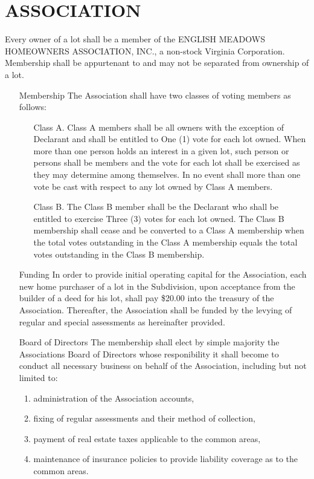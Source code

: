 \documentclass[12pt, letterpaper]{article}
\begin{document}
\section{ASSOCIATION}
Every owner of a lot shall be a member of the ENGLISH MEADOWS HOMEOWNERS ASSOCIATION, INC., a non-stock Virginia Corporation.
Membership shall be appurtenant to and may not be separated from ownership of a lot.
\begin{enumerate}
 \item[Membership] The Association shall have two classes of voting members as follows:
 \begin{itemize}
  \item[Class A.] Class A members shall be all owners with the exception of Declarant and shall be entitled to One (1) vote for each lot owned.
   When more than one person holds an interest in a given lot, such person or persons shall be members and the vote for each lot shall be exercised as they may determine among themselves.
   In no event shall more than one vote be cast with respect to any lot owned by Class A members.
  \item[Class B.] The Class B member shall be the Declarant who shall be entitled to exercise Three (3) votes for each lot owned.
   The Class B membership shall cease and be converted to a Class A membership when the total votes outstanding in the Class A membership equals the total votes outstanding in the Class B membership.
 \end{itemize}
 \item[Funding] In order to provide initial operating capital for the Association, each new home purchaser of a lot in the Subdivision, upon acceptance from the builder of a deed for his lot, shall pay \$20.00 into the treasury of the Association.
  Thereafter, the Association shall be funded by the levying of regular and special assessments as hereinafter provided.
 \item[Board of Directors] The membership shall elect by simple majority the Associations Board of Directors whose responibility it shall become to conduct all necessary business on behalf of the Association, including but not limited to:
 \begin{enumerate}
  \item administration of the Association accounts,
  \item fixing of regular assessments and their method of collection,
  \item payment of real estate taxes applicable to the common areas,
  \item maintenance of insurance policies to provide liability coverage as to the common areas.
 \end{enumerate}
\end{enumerate}
\end{document}
